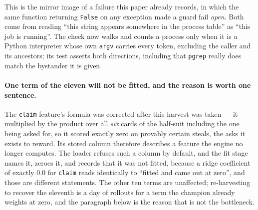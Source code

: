\documentclass[11pt,letterpaper]{article}
\begin{document}
This is the mirror image of a failure this paper already records, in which the
same function returning \texttt{False} on any exception made a guard fail
\emph{open}. Both come from reading ``this string appears somewhere in the
process table'' as ``this job is running''. The check now walks
 and counts a process only when it is a Python interpreter whose
own \texttt{argv} carries every token, excluding the caller and its ancestors;
its test asserts both directions, including that \texttt{pgrep} really does
match the bystander it is given.

\paragraph{One term of the eleven will not be fitted, and the reason is worth
one sentence.} The \texttt{claim} feature's formula was corrected after this
harvest was taken --- it multiplied by the product over all \emph{six} cards of
the half-suit including the one being asked for, so it scored exactly zero on
provably certain steals, the asks it exists to reward. Its stored column
therefore describes a feature the engine no longer computes. The loader refuses
such a column by default, and the fit stage names it, zeroes it, and records
that it was not fitted, because a ridge coefficient of exactly $0.0$ for
\texttt{claim} reads identically to ``fitted and came out at zero'', and those
are different statements. The other ten terms are unaffected; re-harvesting to
recover the eleventh is a day of rollouts for a term the champion already
weights at zero, and the paragraph below is the reason that is not the
bottleneck.
\end{document}
